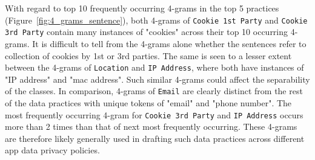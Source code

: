 With regard to top 10 frequently occurring 4-grams in the top 5 practices (Figure~\ref{fig:4_grams_sentence}), both 4-grams of \texttt{Cookie 1st Party} and \texttt{Cookie 3rd Party} contain many instances of "cookies" across their top 10 occurring 4-grams. It is difficult to tell from the 4-grams alone whether the sentences refer to collection of cookies by 1st or 3rd parties. The same is seen to a lesser extent between the 4-grams of \texttt{Location} and \texttt{IP Address}, where both have instances of "IP address" and "mac address". Such similar 4-grams could affect the separability of the classes. In comparison, 4-grams of \texttt{Email} are clearly distinct from the rest of the data practices with unique tokens of "email" and "phone number". The most frequently occurring 4-gram for \texttt{Cookie 3rd Party} and \texttt{IP Address} occurs more than 2 times than that of next most frequently occurring. These 4-grams are therefore likely generally used in drafting such data practices across different app data privacy policies.

